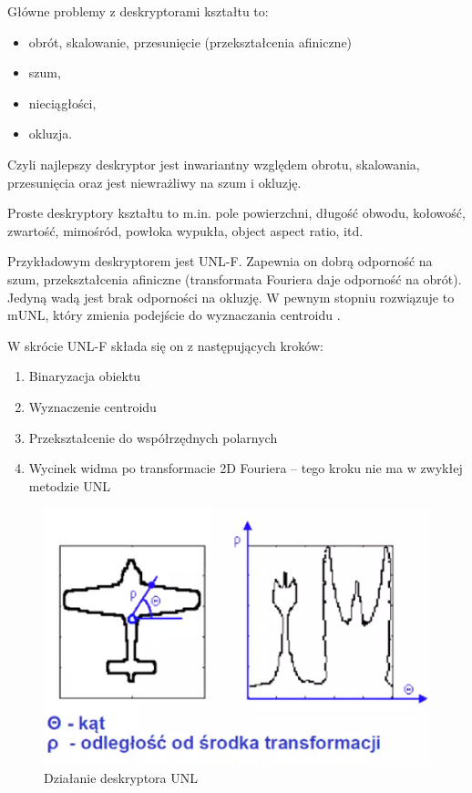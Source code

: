 \documentclass[wi]{zut}
\begin{document}
Główne problemy z deskryptorami kształtu to:

\begin{itemize}
    \item obrót, skalowanie, przesunięcie (przekształcenia afiniczne)
    \item szum,
    \item nieciągłości,
    \item okluzja.
\end{itemize}

Czyli najlepszy deskryptor jest inwariantny względem obrotu, skalowania, przesunięcia oraz jest niewrażliwy na szum i okluzję.

Proste deskryptory kształtu to m.in. pole powierzchni, długość obwodu, kołowość, zwartość, mimośród, powłoka wypukła, object aspect ratio, itd. \cite{Frejlichowski2020_2}

Przykładowym deskryptorem jest UNL-F. Zapewnia on dobrą odporność na szum, przekształcenia afiniczne (transformata Fouriera daje odporność na obrót). Jedyną wadą jest brak odporności na okluzję. W pewnym stopniu rozwiązuje to mUNL, który zmienia podejście do wyznaczania centroidu  \cite{Frejlichowski2020_2}.

W skrócie UNL-F składa się on z następujących kroków:

\begin{enumerate}
    \item Binaryzacja obiektu
    \item Wyznaczenie centroidu
    \item Przekształcenie do współrzędnych polarnych
    \item Wycinek widma po transformacie 2D Fouriera -- tego kroku nie ma w zwykłej metodzie UNL
\end{enumerate}

\begin{figure}[H]
    \centering
    \includegraphics[width=0.5\linewidth]{images/unl.png}
    \caption{Działanie deskryptora UNL}
    \label{fig:unl}
\end{figure}
\end{document}
